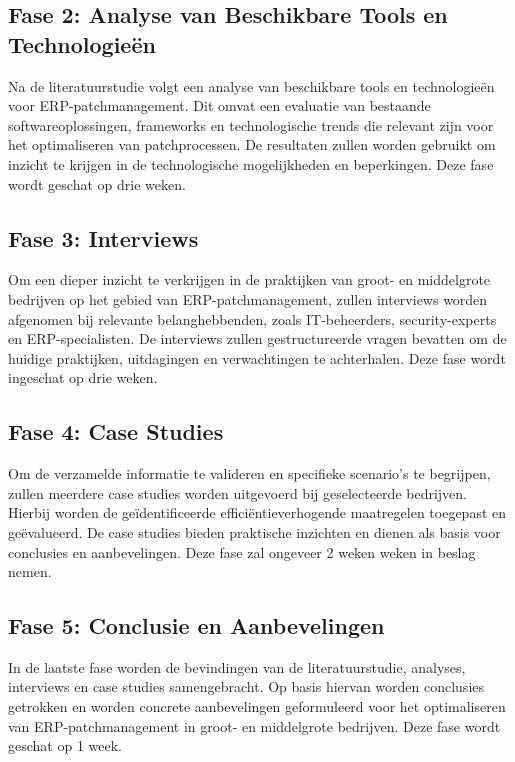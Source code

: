 \subsection{Fase 2: Analyse van Beschikbare Tools en Technologieën}

Na de literatuurstudie volgt een analyse van beschikbare tools en technologieën voor ERP-patchmanagement. Dit omvat een evaluatie van bestaande softwareoplossingen, frameworks en technologische trends die relevant zijn voor het optimaliseren van patchprocessen. De resultaten zullen worden gebruikt om inzicht te krijgen in de technologische mogelijkheden en beperkingen. Deze fase wordt geschat op drie weken.

\subsection{Fase 3: Interviews}

Om een dieper inzicht te verkrijgen in de praktijken van groot- en middelgrote bedrijven op het gebied van ERP-patchmanagement, zullen interviews worden afgenomen bij relevante belanghebbenden, zoals IT-beheerders, security-experts en ERP-specialisten. De interviews zullen gestructureerde vragen bevatten om de huidige praktijken, uitdagingen en verwachtingen te achterhalen. Deze fase wordt ingeschat op drie weken.

\subsection{Fase 4: Case Studies}

Om de verzamelde informatie te valideren en specifieke scenario's te begrijpen, zullen meerdere case studies worden uitgevoerd bij geselecteerde bedrijven. Hierbij worden de geïdentificeerde efficiëntieverhogende maatregelen toegepast en geëvalueerd. De case studies bieden praktische inzichten en dienen als basis voor conclusies en aanbevelingen. Deze fase zal ongeveer 2 weken weken in beslag nemen.

\subsection{Fase 5: Conclusie en Aanbevelingen}

In de laatste fase worden de bevindingen van de literatuurstudie, analyses, interviews en case studies samengebracht. Op basis hiervan worden conclusies getrokken en worden concrete aanbevelingen geformuleerd voor het optimaliseren van ERP-patchmanagement in groot- en middelgrote bedrijven. Deze fase wordt geschat op 1 week.


